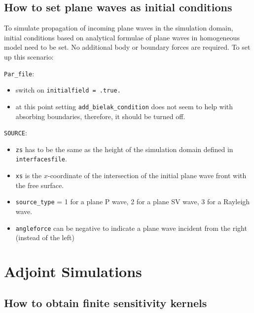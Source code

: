 \documentclass[oneside,english,onecolumn,letterpaper]{book}
\begin{document}
\section{How to set plane waves as initial conditions}
To simulate propagation of incoming plane waves in the simulation domain, initial conditions based on analytical formulae of plane waves in homogeneous model need to be set. No additional body or boundary forces are required. To set up this scenario:
%
\begin{description}
\item{\verb+Par_file+:}
  \begin{itemize}
  \item switch on \verb+initialfield = .true. +
  \item at this point setting \verb+add_bielak_condition+ does not seem to help with absorbing boundaries, therefore, it should be turned off.
  \end{itemize}
\item{\verb+SOURCE+:}
  \begin{itemize}
  \item \verb+zs+ has to be the same as the height of the simulation domain defined in \verb+interfacesfile+.
  \item \verb+xs+ is the $x$-coordinate of the intersection of the initial plane wave front with the free surface.
  \item \verb+source_type+ = 1 for a plane P wave, 2 for a plane SV wave, 3 for a Rayleigh wave.
  \item \verb+angleforce+ can be negative to indicate a plane wave incident from the right (instead of the left)
  \end{itemize}
\end{description}




\chapter{Adjoint Simulations}



\section{How to obtain finite sensitivity kernels}
\end{document}

